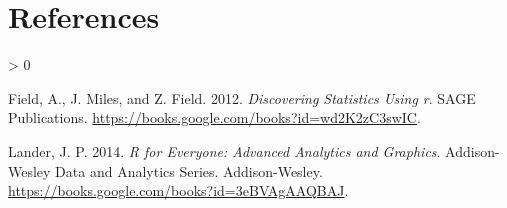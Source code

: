 \documentclass[
]{article}
\newlength{\cslhangindent}
\newenvironment{CSLReferences}[2] %
 {%
  \setlength{\parindent}{0pt}
  \ifodd #1 \everypar{\setlength{\hangindent}{\cslhangindent}}\ignorespaces\fi
  \ifnum #2 > 0
  \setlength{\parskip}{#2\baselineskip}
  \fi
 }%
 {}
\begin{document}
\hypertarget{references}{%
\section*{References}\label{references}}

\hypertarget{refs}{}
\begin{CSLReferences}{1}{0}
\leavevmode\hypertarget{ref-field2012discovering}{}%
Field, A., J. Miles, and Z. Field. 2012. \emph{Discovering Statistics
Using r}. SAGE Publications.
\url{https://books.google.com/books?id=wd2K2zC3swIC}.

\leavevmode\hypertarget{ref-lander2014r}{}%
Lander, J. P. 2014. \emph{R for Everyone: Advanced Analytics and
Graphics}. Addison-Wesley Data and Analytics Series. Addison-Wesley.
\url{https://books.google.com/books?id=3eBVAgAAQBAJ}.

\end{CSLReferences}
\end{document}
